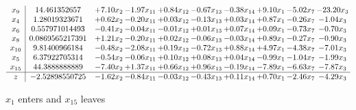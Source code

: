 \documentclass[9pt]{article}
\begin{document}
 \[\begin{array}{c| c c@{\hskip 2pt} c@{\hskip 2pt} c@{\hskip 2pt} c@{\hskip 2pt} c@{\hskip 2pt} c@{\hskip 2pt} c@{\hskip 2pt} c@{\hskip 2pt} }
 x_{9}   &  14.461352657 & +  7.10 x_{2} & -1.97 x_{11} & +  0.84 x_{12} & -0.67 x_{13} & -0.38 x_{14} & +  9.10 x_{1} & -5.02 x_{7} & -23.20 x_{3}\\
 x_{4}   &  1.28019323671 & +  0.62 x_{2} & -0.20 x_{11} & +  0.03 x_{12} & -0.13 x_{13} & +  0.03 x_{14} & +  0.87 x_{1} & -0.26 x_{7} & -1.04 x_{3}\\
 x_{6}   &  0.557971014493 & -0.41 x_{2} & -0.04 x_{11} & -0.01 x_{12} & +  0.01 x_{13} & +  0.07 x_{14} & +  0.09 x_{1} & -0.73 x_{7} & -0.70 x_{3}\\
 x_{8}   &  0.0869565217391 & +  1.21 x_{2} & -0.20 x_{11} & +  0.02 x_{12} & -0.06 x_{13} & -0.03 x_{14} & +  0.89 x_{1} & -0.27 x_{7} & -0.90 x_{3}\\
 x_{10}   &  9.81400966184 & -0.48 x_{2} & -2.08 x_{11} & +  0.19 x_{12} & -0.72 x_{13} & +  0.88 x_{14} & +  4.97 x_{1} & -4.38 x_{7} & -7.01 x_{3}\\
 x_{5}   &  6.37922705314 & -0.54 x_{2} & -0.06 x_{11} & +  0.10 x_{12} & +  0.08 x_{13} & +  0.04 x_{14} & -0.99 x_{1} & -1.04 x_{7} & -1.99 x_{3}\\
 x_{15}   &  44.3888888889 & -7.40 x_{2} & +  1.37 x_{11} & +  0.66 x_{12} & +  0.96 x_{13} & -0.19 x_{14} & -7.89 x_{1} & -6.63 x_{7} & -7.87 x_{3}\\
\hline
z    &  -2.52898550725 & -1.62 x_{2} & -0.84 x_{11} & -0.03 x_{12} & -0.43 x_{13} & +  0.11 x_{14} & +  0.70 x_{1} & -2.46 x_{7} & -4.29 x_{3}\\
\end{array}\]


 $ x_{1} $ enters and $ x_{15} $ leaves 
\end{document}
